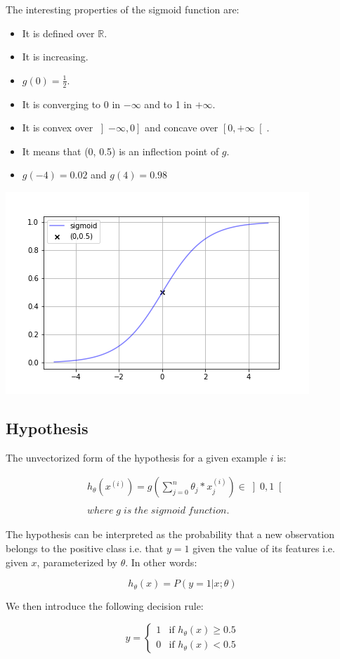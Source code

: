 \documentclass[a4paper, 12pt]{article}
\begin{document}
The interesting properties of the sigmoid function are:
\begin{itemize}
\item It is defined over $\mathbb{R}$.
\item It is increasing. 
\item $g(0) = \frac{1}{2}$.
\item It is converging to 0 in $-\infty$ and to 1 in $+\infty$.
\item It is convex over $\left] -\infty, 0 \right]$ and concave over $\left[ 0, +\infty \right[$.
\item It means that (0, 0.5) is an inflection point of $g$.
\item $g(-4) = 0.02 $ and $g(4) = 0.98 $
\end{itemize}

\begin{center}
  \includegraphics[scale=0.7]{sigmoid}
  \label{fig:sigmoid}
\end{center}

\subsection{Hypothesis}

\noindent
The unvectorized form of the hypothesis for a given example $i$ is:

\begin{align*}
& h_{\theta}(x^{(i)}) = g \left( \sum_{j=0}^{n} \theta_j * x_j^{(i)}  \right) \in \left]0, 1\right[  \\
& \\
& where \; g \; is \; the \; sigmoid \; function.
\end{align*}

The hypothesis can be interpreted as the probability that a new observation belongs to the positive class i.e. that $y=1$ given the value of its features i.e. given $x$, parameterized by $\theta$. In other words:

\begin{equation}
h_{\theta}(x) = P\left(y=1|x;\theta \right)
\end{equation}

We then introduce the following decision rule:

\begin{equation}
y = 
\begin{cases}
1 & \text{if } h_{\theta}(x) \geq 0.5 \\
0 & \text{if } h_{\theta}(x) < 0.5
\end{cases}
\end{equation}
\end{document}
